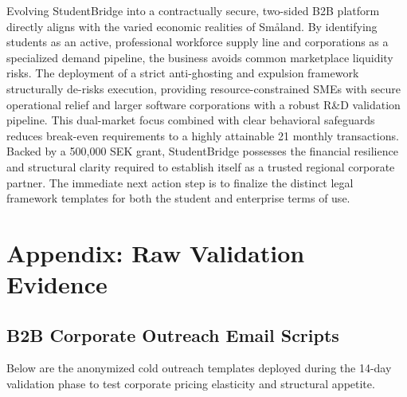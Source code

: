 \documentclass[12pt,a4paper]{article}
\begin{document}
Evolving StudentBridge into a contractually secure, two-sided B2B platform directly aligns with the varied economic realities of Småland. By identifying students as an active, professional workforce supply line and corporations as a specialized demand pipeline, the business avoids common marketplace liquidity risks. The deployment of a strict anti-ghosting and expulsion framework structurally de-risks execution, providing resource-constrained SMEs with secure operational relief and larger software corporations with a robust R\&D validation pipeline. This dual-market focus combined with clear behavioral safeguards reduces break-even requirements to a highly attainable 21 monthly transactions. Backed by a 500,000 SEK grant, StudentBridge possesses the financial resilience and structural clarity required to establish itself as a trusted regional corporate partner. The immediate next action step is to finalize the distinct legal framework templates for both the student and enterprise terms of use.

\newpage
\appendix
\titleformat{\subsection}{\normalsize\bfseries}{\thesubsection\quad}{0em}{}
\renewcommand{\thesubsection}{\Alph{section}.\arabic{subsection}}

\setcounter{page}{1}
\renewcommand{\thepage}{\Alph{page}}

\section{Appendix: Raw Validation Evidence}

\subsection{B2B Corporate Outreach Email Scripts}
\label{app:outreach}

Below are the anonymized cold outreach templates deployed during the 14-day validation phase to test corporate pricing elasticity and structural appetite.
\end{document}
